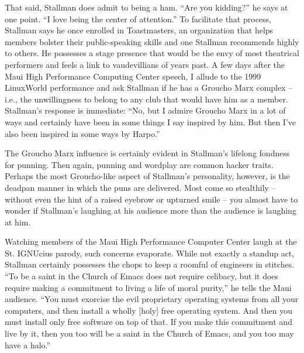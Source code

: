 That said, Stallman does admit to being a ham. ``Are you kidding?'' he says at one point. ``I love being the center of attention.'' To facilitate that process, Stallman says he once enrolled in Toastmasters, an organization that helps members bolster their public-speaking skills and one Stallman recommends highly to others. He possesses a stage presence that would be the envy of most theatrical performers and feels a link to vaudevillians of years past. A few days after the Maui High Performance Computing Center speech, I allude to the 1999 LinuxWorld performance and ask Stallman if he has a Groucho Marx complex -- i.e., the unwillingness to belong to any club that would have him as a member. Stallman's response is immediate: ``No, but I admire Groucho Marx in a lot of ways and certainly have been in some things I say inspired by him. But then I've also been inspired in some ways by Harpo.''

The Groucho Marx influence is certainly evident in Stallman's lifelong fondness for punning. Then again, punning and wordplay are common hacker traits. Perhaps the most Groucho-like aspect of Stallman's personality, however, is the deadpan manner in which the puns are delivered. Most come so stealthily -- without even the hint of a raised eyebrow or upturned smile -- you almost have to wonder if Stallman's laughing at his audience more than the audience is laughing at him.

Watching members of the Maui High Performance Computer Center laugh at the St. IGNUcius parody, such concerns evaporate. While not exactly a standup act, Stallman certainly possesses the chops to keep a roomful of engineers in stitches. ``To be a saint in the Church of Emacs does not require celibacy, but it does require making a commitment to living a life of moral purity,'' he tells the Maui audience. ``You must exorcise the evil proprietary operating systems from all your computers, and then install a wholly [holy] free operating system. And then you must install only free software on top of that. If you make this commitment and live by it, then you too will be a saint in the Church of Emacs, and you too may have a halo.''

